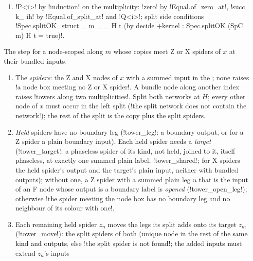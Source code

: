 {{{\begin{algorithm}
\begin{enumerate}
by a chain of \lexlean!Equal.mul_trans! of: an isomorphism from the split to
\lexlean!⟨T.nodes ++ X.nodes, ...⟩!, \lexlean!plug! of the hypothesis, an isomorphism reordering,
\lexlean!plug! of the copies' lemma (recursively \lexpy!fam! on the peeled copies with scalars
$\alpha,\beta$), and an isomorphism to the right split.
\item \lexlean!P<i>! by \lexlean!induction! on the multiplicity: \lexlean!zero! by \lexlean!Equal.of_zero_at!,
\lexlean!succ k_ ih! by \lexlean!Equal.of_split_at! and \lexlean!Q<i>!; split side conditions
\lexlean!Spec.splitOK_struct _ m _ _ H t (by decide +kernel : Spec.splitOK (SpC m) H t = true)!.
\end{enumerate}
\end{algorithm}

\begin{algorithm}\label{alg:lean-export-sym-tower}
The step for a node-scoped \bbox along $m$ whose copies meet Z or X spiders of $x$ at their
bundled inputs.
\begin{enumerate}
\item The \emph{spiders}: the Z and X nodes of $x$ with a summed input in the \bbox; none
raises \lexcode!a node box meeting no Z or X spider!. A bundle node along another index raises
\lexcode!towers along two multiplicities!. Split both networks at $H$; every other node of $x$
must occur in the left split (\lexcode!the split network does not contain the network!); the rest
of the split is the copy plus the split spiders.
\item \emph{Held} spiders have no boundary leg (\lexpy!tower_leg!: a boundary output, or for a Z
spider a plain boundary input). Each held spider needs a \emph{target} (\lexpy!tower_target!: a
phaseless spider of its kind, not held, joined to it, itself phaseless, at exactly one summed
plain label, \lexpy!tower_shared!; for X spiders the held spider's output and the target's plain
input, neither with bundled outputs); without one, a Z spider with a summed plain leg $u$ that
is the input of an F node whose output is a boundary label is \emph{opened}
(\lexpy!tower_open_leg!); otherwise
\lexcode!the spider meeting the node box has no boundary leg and no neighbour of its colour with one!.
\item Each remaining held spider $z_n$ moves the legs its split adds onto its target $z_m$
(\lexpy!tower_move!): the split spiders of both (unique node in the rest of the same kind and
outputs, else \lexcode!the split spider is not found!; the added inputs must extend $z_n$'s inputs

\end{enumerate}
\end{algorithm}}}}
